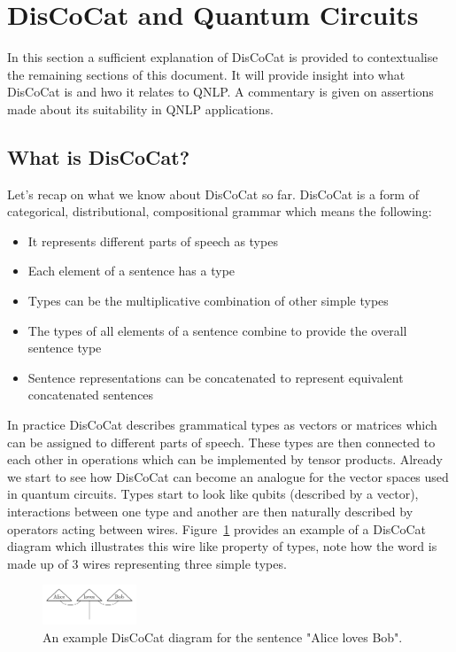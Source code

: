 \documentclass[a4paper,twocolumn,11pt]{quantumarticle}
\begin{document}
    \section{DisCoCat and Quantum Circuits}\label{sec:discocat_circuits}
    In this section a sufficient explanation of DisCoCat is provided to contextualise the remaining
    sections of this document.
    It will provide insight into what DisCoCat is and hwo it relates to QNLP.
    A commentary is given on assertions made about its suitability in QNLP applications.
    \subsection{What is DisCoCat?}\label{subsec:what-is-discocat}
    Let's recap on what we know about DisCoCat so far.
    DisCoCat is a form of categorical, distributional, compositional grammar\cite{discocat} which means the following:
    \begin{itemize}
        \item It represents different parts of speech as types
        \item Each element of a sentence has a type
        \item Types can be the multiplicative combination of other simple types
        \item The types of all elements of a sentence combine to provide the overall sentence type
        \item Sentence representations can be concatenated to represent equivalent concatenated sentences
    \end{itemize}
    \newline
    In practice DisCoCat describes grammatical types as vectors or matrices which can be assigned to different parts
    of speech\cite{qnlp_in_prac}.
    These types are then connected to each other in operations which can be implemented by tensor products\cite{qnlp_in_prac}.
    Already we start to see how DisCoCat can become an analogue for the vector spaces used in quantum circuits.
    Types start to look like qubits (described by a vector), interactions between one type and another are then naturally
    described by operators acting between wires.
    Figure~\ref{fig:discocat-diagram} provides an example of a DisCoCat diagram which illustrates this wire like property
    of types, note how the word  is made up of 3 wires representing three simple types.
    \begin{figure}[h]
        \centering
        \includegraphics[width=0.25\textwidth]{alicelovesbob}
        \caption{An example DisCoCat diagram for the sentence "Alice loves Bob".}
        \label{fig:discocat-diagram}
    \end{figure}
\end{document}
